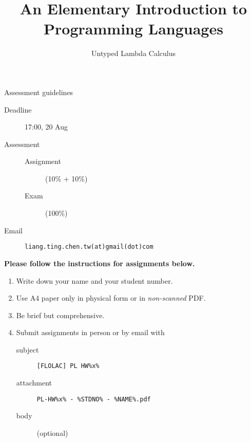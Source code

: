 \title{An Elementary Introduction to Programming Languages}
\subtitle{Untyped Lambda Calculus}

\begin{frame}
\maketitle
\end{frame}

\begin{frame}[fragile]{Assessment guidelines}
  \begin{description}
    \item[Deadline] 17:00, 20 Aug
    \item[Assessment] 
      \begin{description}
        \item[Assignment] (10\% + 10\%)
        \item[Exam] (100\%)
      \end{description}
    \item[Email] \texttt{liang.ting.chen.tw(at)gmail(dot)com}
  \end{description}

  \textbf{Please follow the instructions for assignments below.}

  \begin{enumerate}
    \item Write down your name and your student number. 
    \item Use A4 paper only in physical form or in \emph{non-scanned} PDF. 
    \item Be brief but comprehensive.
    \item Submit assignments in person or by email with 
      \begin{description}
        \item[subject] \texttt{[FLOLAC] PL HW\%x\%}
        \item[attachment] \texttt{PL-HW\%x\% - \%STDNO\% - \%NAME\%.pdf}
        \item[body] (optional)
      \end{description}
  \end{enumerate}
\end{frame}

